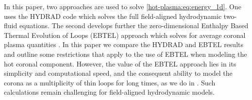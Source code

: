 In this paper, two approaches are used to solve \autoref{hot-plasma:eq:energy_1d}. One uses the HYDRAD code \citep{bradshaw_influence_2013} which solves the full field-aligned hydrodynamic two-fluid equations. The second develops further the zero-dimensional Enthalpy Based Thermal Evolution of Loops (EBTEL) approach which solves for average coronal plasma quantities \citep{klimchuk_highly_2008,cargill_enthalpy-based_2012,cargill_enthalpy-based_2012-1,cargill_modelling_2015}. In this paper we compare the HYDRAD and EBTEL results and outline some restrictions that apply to the use of EBTEL when modeling the hot coronal component. However, the value of the EBTEL approach lies in its simplicity and computational speed, and the consequent ability to model the corona as a multiplicity of thin loops for long times, as we do in . Such calculations remain challenging for field-aligned hydrodynamic models.

